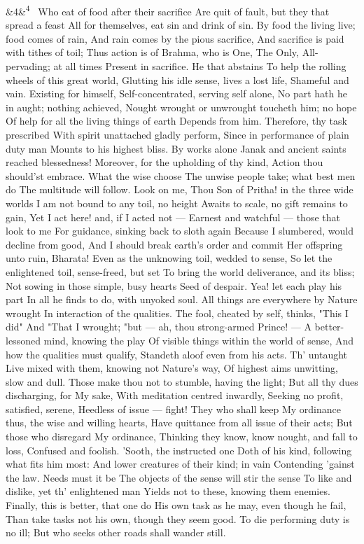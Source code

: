 \documentclass[12pt]{article}
\newcommand{\para}[1][]{\par\noindent\ifx&#1&\else\textsuperscript{\footnotesize #1}~\fi}
\begin{document}
\para[4] Who eat of food after their sacrifice Are quit of fault, but they that spread a feast All for themselves, eat sin and drink of sin. By food the living live; food comes of rain, And rain comes by the pious sacrifice, And sacrifice is paid with tithes of toil; Thus action is of Brahma, who is One, The Only, All-pervading; at all times Present in sacrifice. He that abstains To help the rolling wheels of this great world, Glutting his idle sense, lives a lost life, Shameful and vain. Existing for himself, Self-concentrated, serving self alone, No part hath he in aught; nothing achieved, Nought wrought or unwrought toucheth him; no hope Of help for all the living things of earth Depends from him. Therefore, thy task prescribed With spirit unattached gladly perform, Since in performance of plain duty man Mounts to his highest bliss. By works alone Janak and ancient saints reached blessedness! Moreover, for the upholding of thy kind, Action thou should'st embrace. What the wise choose The unwise people take; what best men do The multitude will follow. Look on me, Thou Son of Pritha! in the three wide worlds I am not bound to any toil, no height Awaits to scale, no gift remains to gain, Yet I act here! and, if I acted not --- Earnest and watchful --- those that look to me For guidance, sinking back to sloth again Because I slumbered, would decline from good, And I should break earth's order and commit Her offspring unto ruin, Bharata! Even as the unknowing toil, wedded to sense, So let the enlightened toil, sense-freed, but set To bring the world deliverance, and its bliss; Not sowing in those simple, busy hearts Seed of despair. Yea! let each play his part In all he finds to do, with unyoked soul. All things are everywhere by Nature wrought In interaction of the qualities. The fool, cheated by self, thinks, "This I did" And "That I wrought; "but --- ah, thou strong-armed Prince! --- A better-lessoned mind, knowing the play Of visible things within the world of sense, And how the qualities must qualify, Standeth aloof even from his acts. Th' untaught Live mixed with them, knowing not Nature's way, Of highest aims unwitting, slow and dull. Those make thou not to stumble, having the light; But all thy dues discharging, for My sake, With meditation centred inwardly, Seeking no profit, satisfied, serene, Heedless of issue --- fight! They who shall keep My ordinance thus, the wise and willing hearts, Have quittance from all issue of their acts; But those who disregard My ordinance, Thinking they know, know nought, and fall to loss, Confused and foolish. 'Sooth, the instructed one Doth of his kind, following what fits him most: And lower creatures of their kind; in vain Contending 'gainst the law. Needs must it be The objects of the sense will stir the sense To like and dislike, yet th' enlightened man Yields not to these, knowing them enemies. Finally, this is better, that one do His own task as he may, even though he fail, Than take tasks not his own, though they seem good. To die performing duty is no ill; But who seeks other roads shall wander still.
\end{document}
